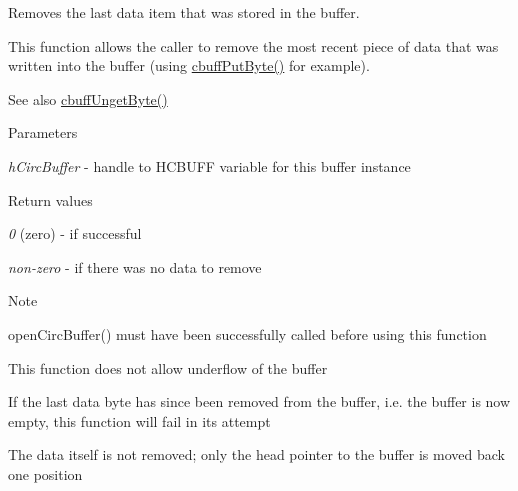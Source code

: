 Removes the last data item that was stored in the buffer. 

This function allows the caller to remove the most recent piece of data that was written into the buffer (using \hyperlink{group___c_b_u_f_fput_get_functions_ga999b3c089262828104f8e8e10cefb5cd}{cbuffPutByte()} for example).

\begin{DoxySeeAlso}{See also}
\hyperlink{group___c_b_u_f_funput_unget_functions_ga5ab9ce68b6c922f1004bfb099a019d69}{cbuffUngetByte()}
\end{DoxySeeAlso}

\begin{DoxyParams}{Parameters}
\item[{\em hCircBuffer}]-\/ handle to HCBUFF variable for this buffer instance\end{DoxyParams}

\begin{DoxyRetVals}{Return values}
\item[{\em 0}](zero) -\/ if successful \item[{\em non-\/zero}]-\/ if there was no data to remove\end{DoxyRetVals}
\begin{DoxyNote}{Note}

\begin{DoxyEnumerate}
\item openCircBuffer() must have been successfully called before using this function
\item This function does not allow underflow of the buffer
\item If the last data byte has since been removed from the buffer, i.e. the buffer is now empty, this function will fail in its attempt
\item The data itself is not removed; only the head pointer to the buffer is moved back one position 
\end{DoxyEnumerate}
\end{DoxyNote}
